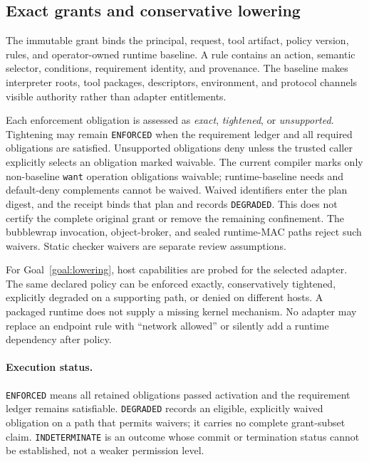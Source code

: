 \documentclass[letterpaper,twocolumn,10pt]{article}
\newcommand{\code}[1]{\texttt{#1}}
\begin{document}
\subsection{Exact grants and conservative lowering}
\label{sec:lowering}

The immutable grant binds the principal, request, tool artifact, policy version,
rules, and operator-owned runtime baseline. A rule contains an action, semantic
selector, conditions, requirement identity, and provenance. The baseline makes
interpreter roots, tool packages, descriptors, environment, and protocol
channels visible authority rather than adapter entitlements.

Each enforcement obligation is assessed as \emph{exact}, \emph{tightened}, or
\emph{unsupported}. Tightening may remain \code{ENFORCED} when the requirement
ledger and all required obligations are satisfied. Unsupported obligations deny
unless the trusted caller explicitly selects an obligation marked waivable.
The current compiler marks only non-baseline \code{want} operation obligations
waivable; runtime-baseline needs and default-deny complements cannot be waived.
Waived identifiers enter the plan digest, and the receipt binds that plan and
records \code{DEGRADED}. This does not certify the complete original grant or
remove the remaining confinement. The bubblewrap invocation, object-broker, and sealed runtime-MAC paths
reject such waivers. Static checker waivers are separate review assumptions.

For Goal~\ref{goal:lowering}, host capabilities are probed for the selected
adapter. The same declared policy
can be enforced exactly, conservatively tightened, explicitly degraded on a
supporting path, or denied on different hosts. A packaged runtime does not
supply a missing kernel mechanism. No adapter may replace an endpoint rule with
``network allowed'' or silently add a runtime dependency after policy.

\paragraph{Execution status.}
\code{ENFORCED} means all retained obligations passed activation and the
requirement ledger remains satisfiable. \code{DEGRADED} records an eligible,
explicitly waived obligation on a path that permits waivers; it carries no
complete grant-subset claim. \code{INDETERMINATE} is an outcome whose commit or
termination status cannot be established, not a weaker permission level.
\end{document}
